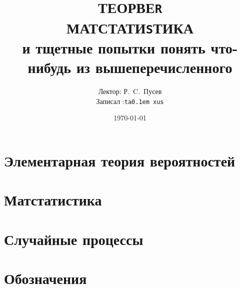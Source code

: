 \documentclass[12pt,timbord]{../notes}
\title{ТЕОРВЕ{\tt R} \\
  МАТСТАТИ{\tt S}ТИКА\\
  и тщетные попытки понять что-нибудь из вышеперечисленного
}
\date{\today}
\author{Лектор: Р.~C.~Пусев \\
Записал :\texttt{ta\lower 0.1em \hbox{x}us}}
\begin{document}
 
\maketitle
\tableofcontents
\clearpage

\chapter{Элементарная теория вероятностей}

\chapter{Матстатистика}

\chapter{Случайные процессы}


\clearpage

\appendix
\chapter{Обозначения}






\end{document}
